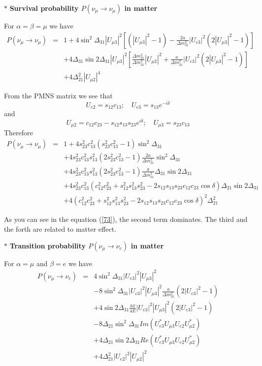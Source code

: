\documentclass[a4 paper,12pt]{report}%
\begin{document}
$*$ \textbf{Survival probability $P(\nu_\mu \rightarrow \nu_\mu)$  in matter}\par
For $\alpha = \beta = \mu$ we have
\begin{eqnarray}\label{72} \nonumber
P(\nu_\mu \rightarrow \nu_\mu) &=&1 + 4\sin^2\Delta_{31}|U_{\mu3}|^2\left[(|U_{\mu3}|^2-1)-\frac{2a}{\Delta m^2_{31}}|U_{e3}|^2\left(2|U_{\mu 3}|^2-1\right)\right]\\ \nonumber
&&+4\Delta_{31}\sin2\Delta_{31}|U_{\mu 3}|^2\left[\frac{\Delta m^2_{21}}{\Delta m^2_{31}}|U_{\mu 2}|^2 + \frac{a}{\Delta m^2_{31}}|U_{e 3}|^2\left(2|U_{\mu 3}|^2-1\right)\right] \\
&&+4\Delta_{21}^2|U_{\mu 2}|^4 
\end{eqnarray}\par
From the PMNS matrix we see that
$$U_{e2} = s_{12}c_{13};\quad U_{e3} = s_{13}e^{-i\delta}$$
and
$$U_{\mu 2} = c_{12}c_{23}-s_{12}s_{13}s_{23}e^{i\delta}; \quad U_{\mu 3} = s_{23}c_{13}$$
Therefore
\begin{eqnarray}\label{73} \nonumber
P(\nu_\mu \rightarrow \nu_\mu) &=&1 + 4s^2_{23}c^2_{13}(s^2_{23}c^2_{13}-1)\sin^2\Delta_{31}\\ \nonumber
&&+4s^2_{23}c^2_{13}s^2_{13}\left(2s^2_{23}c^2_{13}-1\right)\frac{2a}{\Delta m^2_{31}}\sin^2\Delta_{31}\\ \nonumber
&&+4s^2_{23}c^2_{13}s_{13}^2\left(2s^2_{23}c^2_{13}-1\right) \frac{a}{\Delta m^2_{31}}\Delta_{31}\sin2\Delta_{31} \\ \nonumber
&&+4s^2_{23}c^2_{13}(c^2_{12}c^2_{23} + s^2_{12}s^2_{13}s^2_{23}-2s_{12}s_{13}s_{23}c_{12}c_{23}\cos\delta)\Delta_{21}\sin2\Delta_{31}\\ 
&&+4(c^2_{12}c^2_{23} + s^2_{12}s^2_{13}s^2_{23}-2s_{12}s_{13}s_{23}c_{12}c_{23}\cos\delta)^2\Delta_{21}^2
\end{eqnarray}\par
As you can see in the equation (\ref{73}), the second term dominates. The third and the forth are related to matter effect.\par
$*$ \textbf{Transition probability $P(\nu_\mu \rightarrow \nu_e)$  in matter}\par
For $\alpha = \mu$ and $ \beta =e$ we have
 \begin{eqnarray}\label{74} \nonumber
P(\nu_\mu \rightarrow \nu_e) &=&4\sin^2\Delta_{31}|U_{e 3}|^2|U_{\mu 3}|^2\\ \nonumber
&&-8\sin^2\Delta_{31}|U_{e 3}|^2|U_{\mu 3}|^2\frac{a}{\Delta m^2_{31}}(2|U_{e3}|^2- 1)\\ \nonumber
&&+ 4\sin2\Delta_{31}\frac{ax}{4E}|U_{e 3}|^2|U_{\mu 3}|^2(2|U_{e3}|^2-1)\\ \nonumber
&&- 8 \Delta_{21}\sin^2\Delta_{31}Im(U^*_{e 3}U_{\mu 3}U_{e 2}U^*_{\mu 2})\\ \nonumber
&&+4\Delta_{21}\sin2\Delta_{31}Re(U^*_{e 3}U_{\mu 3}U_{e 2}U^*_{\mu 2})  \\
&&+4\Delta_{21}^2|U_{e 2}|^2|U_{\mu 2}|^2 
\end{eqnarray}\par
\end{document}

